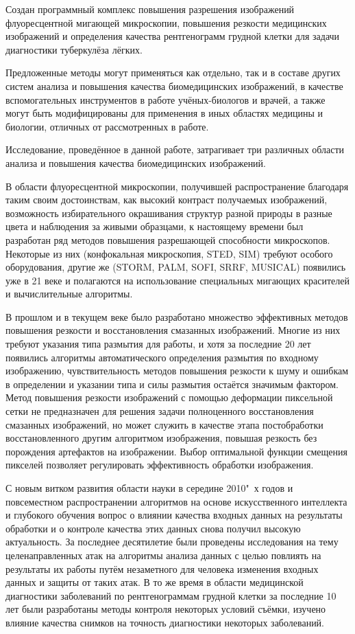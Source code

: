 {\influence}

Создан программный комплекс повышения разрешения изображений флуоресцентной мигающей микроскопии, повышения резкости медицинских изображений и определения качества рентгенограмм грудной клетки для задачи диагностики туберкулёза лёгких.

Предложенные методы могут применяться как отдельно, так и в составе других систем анализа и повышения качества биомедицинских изображений, в качестве вспомогательных инструментов в работе учёных-биологов и врачей, а также могут быть модифицированы для применения в иных областях медицины и биологии, отличных от рассмотренных в работе.

{\progress}

Исследование, проведённое в данной работе, затрагивает три различных области анализа и повышения качества биомедицинских изображений.

В области флуоресцентной микроскопии, получившей распространение благодаря таким своим достоинствам, как высокий контраст получаемых изображений, возможность избирательного окрашивания структур разной природы в разные цвета и наблюдения за живыми образцами, к настоящему времени был разработан ряд методов повышения разрешающей способности микроскопов. Некоторые из них (конфокальная микроскопия, STED, SIM) требуют особого оборудования, другие же (STORM, PALM, SOFI, SRRF, MUSICAL) появились уже в 21 веке и полагаются на использование специальных мигающих красителей и вычислительные алгоритмы.

В прошлом и в текущем веке было разработано множество эффективных методов повышения резкости и восстановления смазанных изображений. Многие из них требуют указания типа размытия для работы, и хотя за последние 20 лет появились алгоритмы автоматического определения размытия по входному изображению, чувствительность методов повышения резкости к шуму и ошибкам в определении и указании типа и силы размытия остаётся значимым фактором. Метод повышения резкости изображений с помощью деформации пиксельной сетки не предназначен для решения задачи полноценного восстановления смазанных изображений, но может служить в качестве этапа постобработки восстановленного другим алгоритмом изображения, повышая резкость без порождения артефактов на изображении. Выбор оптимальной функции смещения пикселей позволяет регулировать эффективность обработки изображения.

С новым витком развития области науки в середине 2010"~х годов и повсеместном распространении алгоритмов на основе искусственного интеллекта и глубокого обучения вопрос о влиянии качества входных данных на результаты обработки и о контроле качества этих данных снова получил высокую актуальность. За последнее десятилетие были проведены исследования на тему целенаправленных атак на алгоритмы анализа данных с целью повлиять на результаты их работы путём незаметного для человека изменения входных данных и защиты от таких атак. В то же время в области медицинской диагностики заболеваний по рентгенограммам грудной клетки за последние 10 лет были разработаны методы контроля некоторых условий съёмки, изучено влияние качества снимков на точность диагностики некоторых заболеваний.


